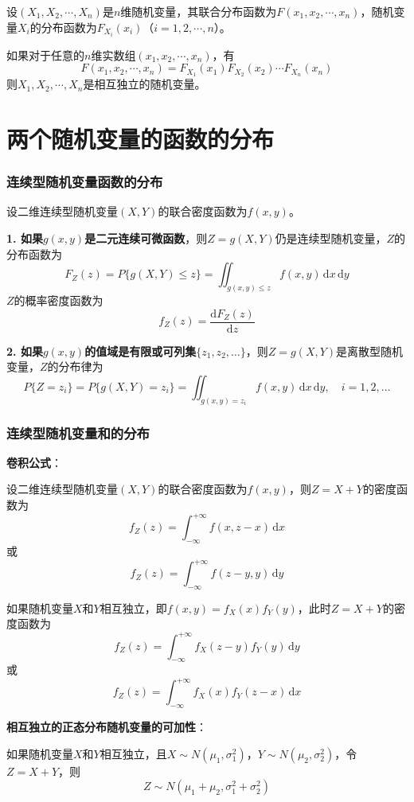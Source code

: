 \documentclass[11pt,a4paper]{report}
\theoremstyle{definition}
\theoremstyle{plain}
\begin{document}
设\((X_1,X_2,\cdots,X_n)\)是\(n\)维随机变量，其联合分布函数为\(F(x_1,x_2,\cdots,x_n)\)，随机变量\(X_i\)的分布函数为\(F_{X_i}(x_i)\)（\(i=1,2,\cdots,n\)）。

如果对于任意的\(n\)维实数组\((x_1,x_2,\cdots,x_n)\)，有
\[
F(x_1,x_2,\cdots,x_n)=F_{X_1}(x_1)F_{X_2}(x_2)\cdots F_{X_n}(x_n)
\]
则\(X_1,X_2,\cdots,X_n\)是相互独立的随机变量。

\section{两个随机变量的函数的分布}

\subsubsection{连续型随机变量函数的分布}

设二维连续型随机变量\((X,Y)\)的联合密度函数为\(f(x,y)\)。

\textbf{1. 如果\(g(x,y)\)是二元连续可微函数}，则\(Z=g(X,Y)\)仍是连续型随机变量，\(Z\)的分布函数为
\[
F_Z(z)=P\{g(X,Y)\leq z\}=\iint_{g(x,y)\leq z}f(x,y)\,\mathrm{d}x\,\mathrm{d}y
\]
\(Z\)的概率密度函数为
\[
f_Z(z)=\frac{\mathrm{d}F_Z(z)}{\mathrm{d}z}
\]

\textbf{2. 如果\(g(x,y)\)的值域是有限或可列集\(\{z_1,z_2,\ldots\}\)}，则\(Z=g(X,Y)\)是离散型随机变量，\(Z\)的分布律为
\[
P\{Z=z_i\}=P\{g(X,Y)=z_i\}=\iint_{g(x,y)=z_i}f(x,y)\,\mathrm{d}x\,\mathrm{d}y,\quad i=1,2,\ldots
\]

\subsubsection{连续型随机变量和的分布}

\textbf{卷积公式}：

设二维连续型随机变量\((X,Y)\)的联合密度函数为\(f(x,y)\)，则\(Z=X+Y\)的密度函数为
\[
f_Z(z)=\int_{-\infty}^{+\infty}f(x,z-x)\,\mathrm{d}x
\]
或
\[
f_Z(z)=\int_{-\infty}^{+\infty}f(z-y,y)\,\mathrm{d}y
\]

如果随机变量\(X\)和\(Y\)相互独立，即\(f(x,y)=f_X(x)f_Y(y)\)，此时\(Z=X+Y\)的密度函数为
\[
f_Z(z)=\int_{-\infty}^{+\infty}f_X(z-y)f_Y(y)\,\mathrm{d}y
\]
或
\[
f_Z(z)=\int_{-\infty}^{+\infty}f_X(x)f_Y(z-x)\,\mathrm{d}x
\]

\textbf{相互独立的正态分布随机变量的可加性}：

如果随机变量\(X\)和\(Y\)相互独立，且\(X\sim N(\mu_1,\sigma_1^2)\)，\(Y\sim N(\mu_2,\sigma_2^2)\)，令\(Z=X+Y\)，则
\[
Z\sim N(\mu_1+\mu_2,\sigma_1^2+\sigma_2^2)
\]
\end{document}
